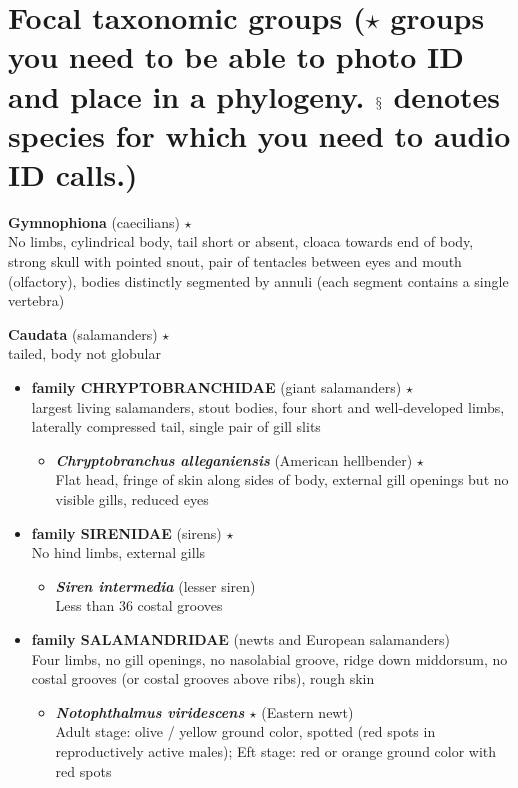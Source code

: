 \documentclass[a4paper,12pt]{article}
\begin{document}
\section*{Focal taxonomic groups ($\star$ groups you need to be able to photo ID and place in a phylogeny. $\mathsection$ denotes species for which you need to audio ID calls.)}
\begin{description}
\item{\textbf{Gymnophiona} (caecilians) $\star$} \\ No limbs, cylindrical body, tail short or absent, cloaca towards end of body, strong skull with pointed snout, pair of tentacles between eyes and mouth (olfactory), bodies distinctly segmented by annuli (each segment contains a single vertebra)
\item{\textbf{Caudata} (salamanders) $\star$} \\ tailed, body not globular
\begin{itemize}
  \item{\textbf{family CHRYPTOBRANCHIDAE} (giant salamanders) $\star$} \\ largest living salamanders, stout bodies, four short and well-developed limbs, laterally compressed tail, single pair of gill slits
  \begin{itemize}
    \item{\textbf{\textit{   Chryptobranchus alleganiensis}} (American hellbender) $\star$} \\ Flat head, fringe of skin along sides of body, external gill openings but no visible gills, reduced eyes
  \end{itemize}
  \item{\textbf{family SIRENIDAE} (sirens) $\star$} \\ No hind limbs, external gills
  \begin{itemize}
    \item{\textbf{\textit{   Siren intermedia}} (lesser siren)} \\ Less than 36 costal grooves
  \end{itemize}  
  \item{\textbf{family SALAMANDRIDAE} (newts and European salamanders)} \\ Four limbs, no gill openings, no nasolabial groove, ridge down middorsum, no costal grooves (or costal grooves above ribs), rough skin
  \begin{itemize}
    \item{\textbf{\textit{   Notophthalmus viridescens} $\star$} (Eastern newt)} \\ Adult stage: olive / yellow ground color, spotted (red spots in reproductively active males); Eft stage: red or orange ground color with red spots

\end{itemize}
\end{itemize}
\end{description}
\end{document}
